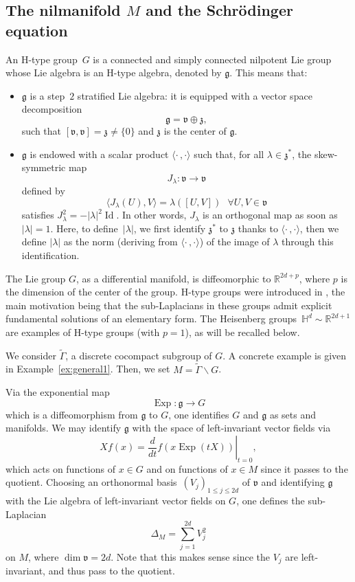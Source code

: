 \documentclass[10pt]{amsart}
\DeclareMathOperator{\Exp}{Exp}
\DeclareMathOperator{\Id}{Id}
\theoremstyle{plain}
\theoremstyle{definition}
\def\R{{\mathbb R}}
\def\bbH{{\mathbb H}}
\begin{document}
\subsection{The nilmanifold $M$ and the Schrödinger equation}
An H-type group~$G$ is a connected and simply connected nilpotent Lie group whose Lie algebra is an H-type algebra, denoted by $\mathfrak g$.
This means that:
\begin{itemize}
\item $\mathfrak g$ is a step~$2$ stratified Lie algebra: it is equipped with a vector space decomposition
\[
{\mathfrak g}= \mathfrak v \oplus \mathfrak z,
\]
such that $[{\mathfrak v},{\mathfrak v}]= {\mathfrak z}\not=\{0\}$ and ${\mathfrak z}$ is the center of ${\mathfrak g}$.
\item
$\mathfrak g$ is endowed with a scalar product $\langle \cdot\,, \cdot\rangle$ such that, for all $\lambda\in\mathfrak z^*$,
the skew-symmetric map
\begin{equation*}
J_\lambda:\mathfrak{v}\to \mathfrak{v}
\end{equation*}
defined by
\begin{equation} \label{e:Jlambda}
\langle J_\lambda(U),V\rangle= \lambda([U,V]) \ \ \ \forall U,V\in \mathfrak{v}
\end{equation}
satisfies $J_\lambda^2= -|\lambda|^2 \Id$. In other words, $J_\lambda$ is an orthogonal map as soon as $|\lambda|=1$. Here, to define~$|\lambda|$, we first identify $\mathfrak z^*$ to $\mathfrak z$ thanks to $\langle\cdot\,,\cdot\rangle$, then we define $|\lambda|$ as the norm (deriving from $\langle\cdot\,,\cdot\rangle$) of the image of $\lambda$ through this identification.
\end{itemize}
The Lie group $G$, as a differential manifold, is diffeomorphic to $\R^{2d+p}$, where $p$ is the dimension of the center of the group. H-type groups were introduced in \cite{Kap80}, the main motivation being that the sub-Laplacians in these groups admit explicit fundamental solutions of an elementary form.
The Heisenberg groups~$\bbH^d\sim \R^{2d+1}$ are examples of H-type groups (with $p=1$), as will be recalled below.

We consider $\widetilde{\Gamma}$, a discrete cocompact subgroup of $G$. A concrete example is given in Example~\ref{ex:general1}. Then, we set $M=\widetilde{\Gamma}\backslash G$.

Via the exponential map
\[
\Exp : {\mathfrak g} \to G
\]
which is a diffeomorphism from ${\mathfrak g}$ to $G$,
one identifies $G$ and ${\mathfrak g}$ as sets and manifolds. We may identify ${\mathfrak g}$ with the space of left-invariant vector fields via
\begin{equation}\label{eq:Xf}
Xf(x)= \left.\frac{d}{dt} f(x\Exp(tX))\right|_{t=0},
\end{equation}
which acts on functions of $x\in G$ and on functions of $x\in M$ since it passes to the quotient.
Choosing an orthonormal basis~$(V_j)_{1\leq j\leq 2d}$ of ${\mathfrak v}$ and identifying $\mathfrak g$ with the Lie algebra of left-invariant vector fields on $G$,
one defines the sub-Laplacian
\[
{\Delta}_M= \sum_{j=1}^{2d} V_j^2
\]
on $M$, where $\dim {\mathfrak v}=2d$. Note that this makes sense since the $V_j$ are left-invariant, and thus pass to the quotient.
\end{document}
